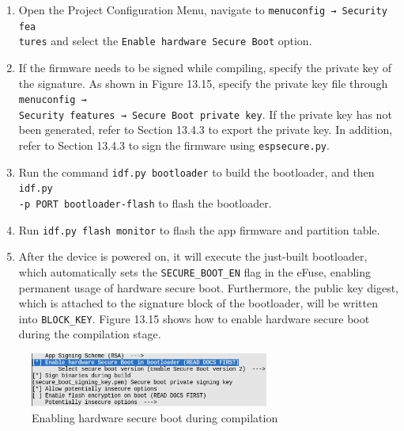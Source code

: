 \documentclass[a4paper,12pt,openany]{book}
\begin{document}
\begin{enumerate}[label=(\arabic*)]
    \item Open the Project Configuration Menu, navigate to \verb|menuconfig → Security fea|\\ \verb|tures| and select the \verb|Enable hardware Secure Boot| option.
    \item If the firmware needs to be signed while compiling, specify the private key of the signature. As shown in Figure 13.15, specify the private key file through \verb|menuconfig → |\\ \verb|Security features → Secure Boot private key|. If the private key has not been generated, refer to Section 13.4.3 to export the private key. In addition, refer to Section 13.4.3 to sign the firmware using \verb|espsecure.py|.
    \item Run the command \verb|idf.py bootloader| to build the bootloader, and then \verb|idf.py |\\ \verb|-p PORT bootloader-flash| to flash the bootloader.
    \item Run \verb|idf.py flash monitor| to flash the app firmware and partition table.
    \item After the device is powered on, it will execute the just-built bootloader, which automatically sets the \verb|SECURE_BOOT_EN| flag in the eFuse, enabling permanent usage of hardware secure boot. Furthermore, the public key digest, which is attached to the signature block of the bootloader, will be written into \verb|BLOCK_KEY|. Figure 13.15 shows how to enable hardware secure boot during the compilation stage.
\end{enumerate}

\begin{figure}[!h]
    \centering
    \includegraphics[width=0.7\textwidth]{D13Z/13-15}
    \caption{Enabling hardware secure boot during compilation}
\end{figure}
\end{document}
